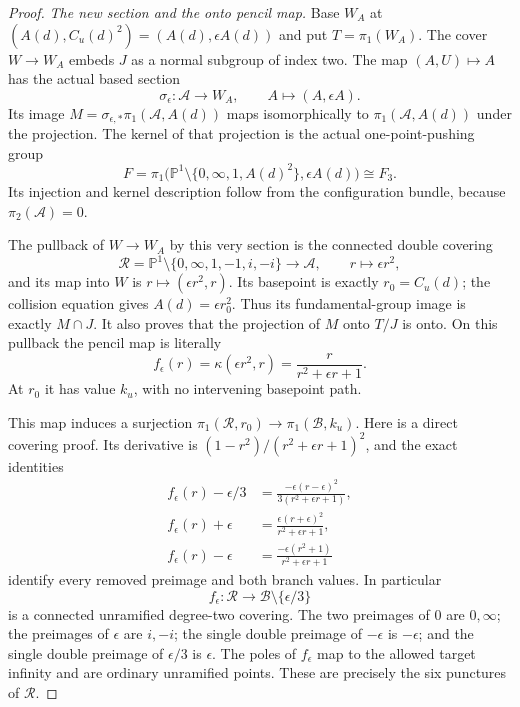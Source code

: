 \begin{proof}
\emph{The new section and the onto pencil map.}
Base $W_A$ at $(A(d),C_u(d)^2)=(A(d),\epsilon A(d))$
and put $T=\pi_1(W_A)$.
The cover $W\to W_A$ embeds $J$ as a normal subgroup
of index two. The map $(A,U)\mapsto A$ has the actual
based section
\[
       \sigma_\epsilon:\mathscr A\longrightarrow W_A,
                    \qquad A\longmapsto(A,\epsilon A).
                                                               \tag{F.21.17}
\]
Its image $M=\sigma_{\epsilon,*}\pi_1(\mathscr A,A(d))$
maps isomorphically to $\pi_1(\mathscr A,A(d))$ under
the projection. The kernel of that projection is
the actual one-point-pushing group
\[
 F=\pi_1\bigl(\mathbb P^1\setminus
                   \{0,\infty,1,A(d)^2\},\epsilon A(d)\bigr)
       \cong F_3 .
                                                               \tag{F.21.18}
\]
Its injection and kernel description follow from the
configuration bundle, because $\pi_2(\mathscr A)=0$.

The pullback of $W\to W_A$ by this very section is
the connected double covering
\[
 \mathscr R=\mathbb P^1\setminus\{0,\infty,1,-1,i,-i\}
       \longrightarrow\mathscr A,
              \qquad r\longmapsto\epsilon r^2,
                                                               \tag{F.21.19}
\]
and its map into $W$ is $r\mapsto(\epsilon r^2,r)$.
Its basepoint is exactly $r_0=C_u(d)$; the collision
equation gives $A(d)=\epsilon r_0^2$.
Thus its fundamental-group image is exactly $M\cap J$.
It also proves that the projection of $M$ onto $T/J$
is onto. On this pullback the pencil map is literally
\[
 f_\epsilon(r)=\kappa(\epsilon r^2,r)
               =\frac{r}{r^2+\epsilon r+1}.
                                                               \tag{F.21.20}
\]
At $r_0$ it has value $k_u$, with no intervening
basepoint path.

This map induces a surjection
$\pi_1(\mathscr R,r_0)\to\pi_1(\mathscr B,k_u)$.
Here is a direct covering proof. Its derivative is
$(1-r^2)/(r^2+\epsilon r+1)^2$, and the exact identities
\[
 \begin{aligned}
 f_\epsilon(r)-\epsilon/3
     &=\frac{-\epsilon(r-\epsilon)^2}
                       {3(r^2+\epsilon r+1)},\\
 f_\epsilon(r)+\epsilon
     &=\frac{\epsilon(r+\epsilon)^2}{r^2+\epsilon r+1},\\
 f_\epsilon(r)-\epsilon
     &=\frac{-\epsilon(r^2+1)}{r^2+\epsilon r+1}
 \end{aligned}                                                \tag{F.21.21}
\]
identify every removed preimage and both branch values.
In particular
\[
 f_\epsilon:\mathscr R\longrightarrow
       \mathscr B\setminus\{\epsilon/3\}
                                                               \tag{F.21.22}
\]
is a connected unramified degree-two covering.
The two preimages of $0$ are $0,\infty$; the preimages
of $\epsilon$ are $i,-i$; the single double preimage
of $-\epsilon$ is $-\epsilon$; and the single double
preimage of $\epsilon/3$ is $\epsilon$.
The poles of $f_\epsilon$ map to the allowed target
infinity and are ordinary unramified points.
These are precisely the six punctures of $\mathscr R$.


\end{proof}
